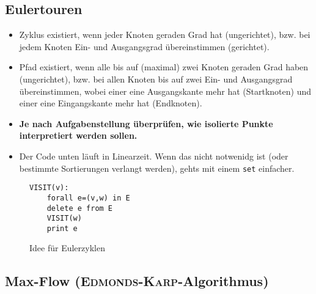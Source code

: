 \subsection{Eulertouren}
\begin{itemize}
	\item Zyklus existiert, wenn jeder Knoten geraden Grad hat (ungerichtet), bzw. bei jedem Knoten Ein- und Ausgangsgrad übereinstimmen (gerichtet).
	\item Pfad existiert, wenn alle bis auf (maximal) zwei Knoten geraden Grad haben (ungerichtet), bzw. bei allen Knoten bis auf zwei Ein- und Ausgangsgrad übereinstimmen, wobei einer eine Ausgangskante mehr hat (Startknoten) und einer eine Eingangskante mehr hat (Endknoten).
	\item \textbf{Je nach Aufgabenstellung überprüfen, wie isolierte Punkte interpretiert werden sollen.}
	\item Der Code unten läuft in Linearzeit. Wenn das nicht notwenidg ist (oder bestimmte Sortierungen verlangt werden), gehts mit einem \lstinline{set} einfacher.
\end{itemize}
\begin{figure}[h]
\begin{lstlisting}
VISIT(v):
	forall e=(v,w) in E
	delete e from E
	VISIT(w)
	print e
\end{lstlisting}
\caption{Idee für Eulerzyklen}
\end{figure}


\subsection{Max-Flow (\textsc{Edmonds-Karp}-Algorithmus)}

